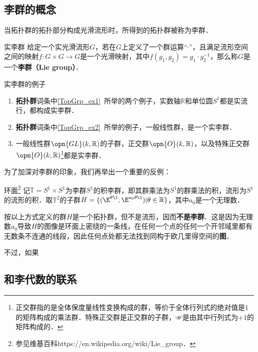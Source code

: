 

\subsection{李群的概念}

当拓扑群的拓扑部分构成光滑流形时，所得到的拓扑群被称为李群．

\begin{definition}{实李群}
给定一个实光滑流形$G$，若在$G$上定义了一个群运算“$\cdot$”，且满足流形空间之间的映射$f:G\times G\rightarrow G$是一个光滑映射，其中$f(g_1, g_2)=g_1\cdot g_2^{-1}$，那么称$G$是一个\textbf{李群（Lie group）}．
\end{definition}

\begin{example}{实李群的例子}
\begin{enumerate}
\item \textbf{拓扑群}词条中\autoref{TopGrp_ex1}~所举的两个例子，实数轴$\mathbb{R}$和单位圆$S^1$都是实流行，都构成实李群．
\item \textbf{拓扑群}词条中\autoref{TopGrp_ex2}~所举的例子，一般线性群，是一个实李群．
\item 一般线性群$\opn{GL}(k, \mathbb{R})$的子群，正交群$\opn{O}(k, \mathbb{R})$，以及特殊正交群$\opn{O}(k, \mathbb{R})$\footnote{正交群指的是全体保度量线性变换构成的群，等价于全体行列式的绝对值是$1$的矩阵构成的乘法群．特殊正交群是正交群的子群，☞是由其中行列式为$+1$的矩阵构成的．}都是实李群．
\end{enumerate}
\end{example}

为了加深对李群的印象，我们再举出一个重要的反例：

\begin{definition}{环面\footnote{参见维基百科https://en.wikipedia.org/wiki/Lie_group．}}
记$\mathbb{T}=S^1\times S^1$为李群$S^1$的积李群，即其群乘法为$S^1$的群乘法的积，流形为$S^1$的流形的积．取$\mathbb{T}^2$的子群$H=\{(\E^{\theta\I}, \E^{a_0\theta\I})|\theta\in\mathbb{R}\}$，其中$a_0$是一个无理数．

按以上方式定义的群$H$是一个拓扑群，但不是流形，因而\textbf{不是李群}．这是因为无理数$a_0$导致$H$的图像是环面上密绕的一条线，在任何一个点的任何一个开邻域里都有无数条不连通的线段，因此任何点处都无法找到同构于欧几里得空间的\textbf{图}．

不过，如果
\end{definition}






\subsection{和李代数的联系}



